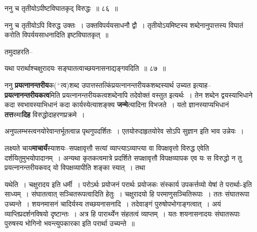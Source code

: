 \documentclass[article,12pt,a4paper]{memoir}
\newcommand{\add}[1]{($^{+}$#1)}
\begin{document}
	  \bigskip
	  \begingroup
	

	  \pstart {}ननु च तृतीयोऽपीष्टविघातकृद् विरुद्धः ॥ ८६ ॥
	\pend
      
	  \endgroup
	 

	  \pstart ननु च तृतीयोऽपि विरुद्ध उक्तः । उक्तविपर्ययसाधनौ द्वौ । तृतीयोऽयमिष्टस्य शब्देनानुपात्तस्य विघातं करोति विपर्ययसाधनादिति इष्टविघातकृत् ॥
	\pend
        

	  \pstart तमुदाहरति--
	\pend
      
	  \endgroup
	
	  \bigskip
	  \begingroup
	

	  \pstart यथा परार्थाश्चक्षुरादयः सङ्घातत्वाच्छयनासनाद्यङ्गवदिति ॥ ८७ ॥
	\pend
      
	  \endgroup
	

	  \pstart ननु \textbf{प्रयत्नानन्तरीय}क\add{त्व}शब्द उपात्तस्तत्किंप्रयत्नानन्तरीयकशब्दस्यार्थ उच्यत इत्याह--\textbf{प्रयत्नानन्तरीयकत्व}मिति प्रयत्नानन्तरीयकत्वशब्देनापि तदेवोक्तं वस्तुत इत्यर्थः । तेन शब्देन द्वयस्याभिधाने कदा स्वभावस्याभिधानं कदा कार्यस्येत्याशङ्क्य \textbf{जन्मे}त्यादिना विभजते । यतो ज्ञानस्याप्यभिधानं \textbf{तत्त}स्मा\textbf{दिह} विरुद्धोदाहरणप्रक्रमे ।
	\pend
      

	  \pstart अनुपलम्भस्त्वनयोरेवान्तर्भूतत्वान्न पृथगुपदर्शितः । एतयोरुदाहृतयोरेव सोऽपि सुज्ञान इति भाव उन्नेयः ।
	\pend
      

	  \pstart लक्ष्यते चाय\textbf{माचार्यं}स्याशयः--सपक्षावृत्तौ सत्यां व्याप्त्याऽव्याप्त्या वा विपक्षवृत्तो विरुद्ध एवेति दर्शयितुमुभयोपादानम् । अन्यथा कृतकत्वमात्रे प्रदर्शिते सपक्षावृत्तौ विपक्षव्यापक एव यः स विरुद्धो न तु प्रयत्नानन्तरीयकवद् यो विपक्षव्यापीति शङ्का स्यात् । तथा  \leavevmode{} 
	  
	यथेति । चक्षुरादय इति धर्मी । परोऽर्थः प्रयोजनं परार्थः प्रयोजकः संस्कार्य उपकर्त्तव्यो येषां ते परार्थाः-इति साध्यम् । संघातत्वात् सञ्चितरूपत्वादिति हेतुः । चक्षुरादयो हि परमाणुसञ्चितिरूपाः । ततः संघातरूपा उच्यन्ते । शयनमासनं चादिर्यस्य तच्छयनासनादि । तदेवाङ्गं पुरुषोपभोगाङ्गत्वात् । अयं व्याप्तिप्रदर्शनविषयो दृष्टान्तः । अत्र हि पारार्थ्येन संहतत्वं व्याप्तम् । यतः शयनासनादयः संघातरूपाः पुरुषस्य भोगिनो भवन्त्युपकारका इति परार्था उच्यन्ते ॥  
	  
\end{document}
